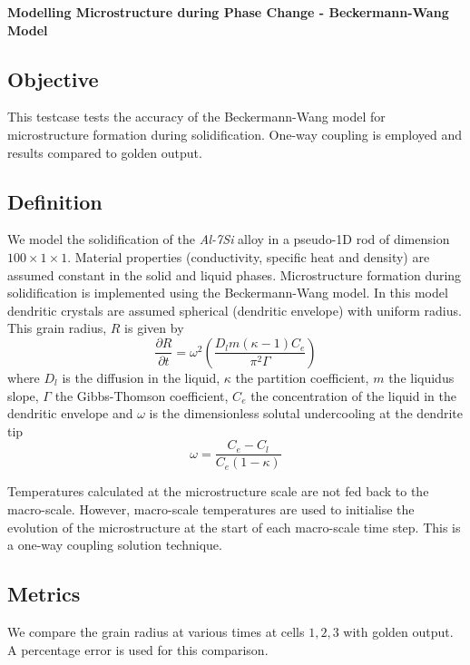 \documentclass[12pt]{article}
\begin{document}
\begin{center}
{\large {\bf Modelling Microstructure during Phase Change - Beckermann-Wang Model}}
\end{center}

\subsection*{Objective}

This testcase tests the accuracy of the Beckermann-Wang model for microstructure
formation during solidification. One-way coupling is employed and results
compared to golden output.

\subsection*{Definition}

We model the solidification of the {\em{Al-7Si}} alloy in a pseudo-1D
rod of dimension $100 \times 1 \times 1$. Material properties (conductivity, 
specific heat and density) are assumed constant in the solid and liquid phases.
Microstructure formation during solidification is implemented using the Beckermann-Wang
model. In this model dendritic crystals are assumed spherical (dendritic envelope) 
with uniform radius. This grain radius, $R$ is given by
\begin{equation}
\frac{\partial R}{\partial t} = \omega^2\left(\frac{D_lm(\kappa - 1)C_e}{\pi^2\Gamma}\right)
\end{equation}
where
$D_l$ is the diffusion in the liquid, $\kappa$ the partition coefficient, $m$ the liquidus slope,
$\Gamma$ the Gibbs-Thomson coefficient, $C_e$ the concentration of the liquid in the 
dendritic envelope and $\omega$ is the dimensionless solutal undercooling at the dendrite tip
\begin{equation}
\omega = \frac{C_e - C_l}{C_e(1-\kappa)}
\end{equation}

Temperatures calculated at the microstructure scale are not fed back to the macro-scale.
However, macro-scale temperatures are used to initialise the evolution of the microstructure
at the start of each macro-scale time step. This is a one-way coupling solution technique.

\subsection*{Metrics}

We compare the grain radius at various times at cells $1,2,3$ with golden output.
A percentage error is used for this comparison.
\end{document}
